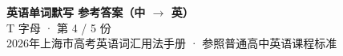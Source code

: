 \documentclass[10pt,a4paper]{article}
\begin{document}
\pagestyle{plain}

\begin{center}
{\LARGE\bfseries 英语单词默写 \quad 参考答案（中 $\to$ 英）}\\[0.22em]
{\large T 字母 · 第 4 / 5 份}\\[0.18em]
{\small 2026年上海市高考英语词汇用法手册 · 参照普通高中英语课程标准}
\end{center}

\vspace{0.2em}
\noindent{\color{rulegray}\rule{\textwidth}{0.8pt}}

\vspace{0.35em}

\vspace{0.25em}
\renewcommand{\arraystretch}{1.32}
\end{document}
